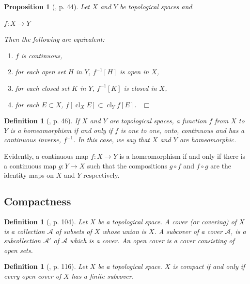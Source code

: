\documentclass[12pt, oneside]{book}
\newtheorem{proposition}[theorem]{Proposition}
\newtheorem{definition}[theorem]{Definition}
\newcommand{\qed}{\hfill ~$\Box$\\}
\def\cl{\operatorname{cl}}
\begin{document}
\begin{proposition}[\cite{W2}, p. 44] \label{charContinuity}
\normalfont
\noindent Let $X$ and $Y$ be topological spaces and 
\begin{center}
$f: X \rightarrow Y$
\end{center}
Then the following are equivalent:
\begin{enumerate}[label=(\alph*)]
\item $f$ is continuous,
\item for each open set $H$ in $Y$, $f^{-1}[H]$ is open in $X$,
\item for each closed set $K$ in $Y$, $f^{-1}[K]$ is closed in $X$,
\item for each $E \subset X$, $f[\cl_X E]\subset \cl_Y f[E]$. \qed
\end{enumerate}
\end{proposition}

\begin{definition}[\cite{W2}, p. 46]
\normalfont
\noindent If $X$ and $Y$ are topological spaces, a function $f$ from $X$ to $Y$ is a {\sl homeomorphism}
 if and only if $f$ is one to one, onto, continuous and has a continuous inverse, $f^{-1}$.  
 In this case, we say that $X$ and $Y$ are homeomorphic.

\end{definition}
\vskip 0.3cm

\noindent Evidently, a continuous map $f: X \to Y$ is a homeomorphism if and only if there is a continuous map $g: Y \to X$ such that the compositions $g \circ f$ and $f \circ g$ are the identity maps on $X$ and $Y$ respectively.
\subsection{Compactness}

\begin{definition}[\cite{W2}, p. 104]
\normalfont
\noindent Let $X$ be a topological space. A {\sl cover} (or {\sl covering}) of $X$ is a collection 
$\mathcal{A}$ of subsets of $X$ whose union is $X$. A subcover of a cover $\mathcal{A}$, 
is a subcollection $\mathcal{A}'$ of $\mathcal{A}$ which is a cover. 
An {\sl open cover} is a cover consisting of open sets.
\end{definition}

\begin{definition}[\cite{W2}, p. 116]
\normalfont
\noindent Let $X$ be a topological space. $X$ is {\sl compact} if and only if every open cover of $X$ 
has a finite subcover.
\end{definition}
\end{document}
